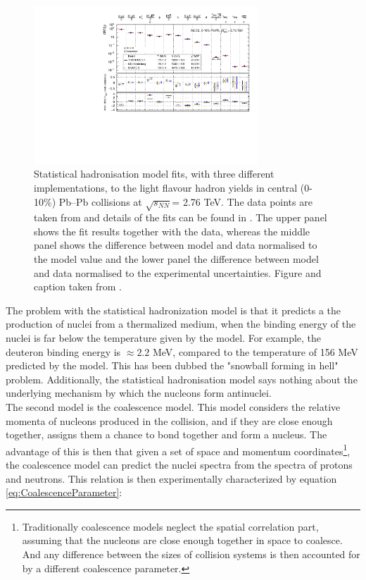 \begin{figure}
    \centering
    \includegraphics[width=0.75\textwidth]{figures/Fit_PbPb0010_GSITHERMUSSHARE_new_alpha_fixed-91746.pdf}
    \caption{Statistical hadronisation model fits, with three different implementations, to the light flavour hadron yields in central (0-10\%) Pb--Pb collisions at $\sqrt{s_{NN}}$= 2.76 TeV. The data points are taken from  and details of the fits can be found in . The upper panel shows the fit results together with the data, whereas the middle panel shows the difference between model and data normalised to the model value and the lower panel the difference between model and data normalised to the experimental uncertainties. Figure and caption taken from \cite{4He_PbPb}.}
    \label{fig:Stat_Hadron_model}
\end{figure}

The problem with the statistical hadronization model is that it predicts a the production of nuclei from a thermalized medium, when the binding energy of the nuclei is far below the temperature given by the model. For example, the deuteron binding energy is $\approx 2.2$ MeV, compared to the temperature of 156 MeV predicted by the model. This has been dubbed the "snowball forming in hell" problem. Additionally, the statistical hadronisation model says nothing about the underlying mechanism by which the nucleons form antinuclei. \\

The second model is the coalescence model. This model considers the relative momenta of nucleons produced in the collision, and if they are close enough together, assigns them a chance to bond together and form a nucleus. The advantage of this is then that given a set of space and momentum coordinates\footnote{Traditionally coalescence models neglect the spatial correlation part, assuming that the nucleons are close enough together in space to coalesce. And any difference between the sizes of collision systems is then accounted for by a different coalescence parameter.}, the coalescence model can predict the nuclei spectra from the spectra of protons and neutrons. This relation is then experimentally characterized by equation \ref{eq:CoalescenceParameter}:

